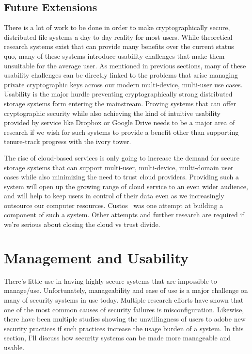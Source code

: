 \documentclass{sig-alternate}
\begin{document}
\subsection{Future Extensions}

There is a lot of work to be done in order to make cryptographically
secure, distributed file systems a day to day reality for most
users. While theoretical research systems exist that can provide many
benefits over the current status quo, many of these systems introduce
usability challenges that make them unsuitable for the average
user. As mentioned in previous sections, many of these usability
challenges can be directly linked to the problems that arise managing
private cryptographic keys across our modern multi-device, multi-user
use cases. Usability is the major hurdle preventing cryptographically
strong distributed storage systems form entering the
mainstream. Proving systems that can offer cryptographic security
while also achieving the kind of intuitive usability provided by
service like Dropbox or Google Drive needs to be a major area of
research if we wish for such systems to provide a benefit other than
supporting tenure-track progress with the ivory tower.

The rise of cloud-based services is only going to increase the demand
for secure storage systems that can support multi-user, multi-device,
multi-domain user cases while also minimizing the need to trust cloud
providers. Providing such a system will open up the growing range of
cloud service to an even wider audience, and will help to keep users
in control of their data even as we increasingly outsource our
computer resources. Custos~\cite{custos-masters} was one attempt at
building a component of such a system. Other attempts and further
research are required if we're serious about closing the cloud vs
trust divide.

\section{Management and Usability}
\label{sec:mgmt}

There's little use in having highly secure systems that are impossible
to manage/use. Unfortunately, manageability and ease of use is a major
challenge on many of security systems in use today. Multiple research
efforts have shown that one of the most common causes of security
failures is misconfiguration. Likewise, there have been multiple
studies showing the unwillingness of users to adobe new security
practices if such practices increase the usage burden of a system. In
this section, I'll discuss how security systems can be made more
manageable and usable.
\end{document}
